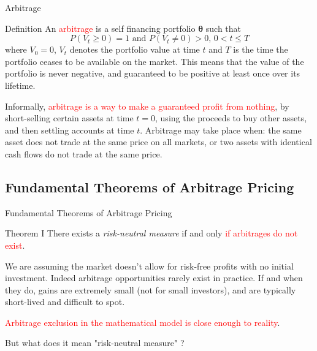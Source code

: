 \documentclass{beamer}
\begin{document}
\begin{frame}{Arbitrage}
	\begin{block}{Definition}
		An \textcolor{red}{arbitrage} is a self financing portfolio $\mathbf{\theta}$ such that
		\begin{equation}
		P(V_{t}\geq 0)=1{\text{ and }}P(V_{t}\neq 0)>0,\,0<t\leq T
		\end{equation}
		where $V_0=0$, $V_t$ denotes the portfolio value at time $t$ and $T$ is the time the portfolio ceases to be available on the market. This means that the value of the portfolio is never negative, and guaranteed to be positive at least once over its lifetime.
	\end{block}
    \pause
	Informally, \textcolor{red}{arbitrage is a way to make a guaranteed profit from nothing}, by short-selling certain assets at time $t = 0$, using the proceeds to buy other assets, and then settling accounts at time $t$. 
	\small{Arbitrage may take place when: the same asset does not trade at the same price on all markets, or two assets with identical cash flows do not trade at the same price}.
\end{frame}

\subsection{Fundamental Theorems of Arbitrage Pricing}
\begin{frame}{Fundamental Theorems of Arbitrage Pricing}
	\begin{block}{Theorem I}
		There exists a \emph{risk-neutral measure} if and only \textcolor{red}{if arbitrages do not exist}.
	\end{block}
	\pause
	\vspace{1cm}
        
    We are assuming the market doesn't allow for risk-free profits with no initial investment.
    Indeed arbitrage opportunities rarely exist in practice. If and when they do, gains are extremely small (not for small investors), and are typically short-lived and difficult to spot. 

    \pause
    \textcolor{red}{Arbitrage exclusion in the mathematical model is close enough to reality}.
	
    \pause
    But what does it mean "risk-neutral measure" ?
\end{frame}
\end{document}
